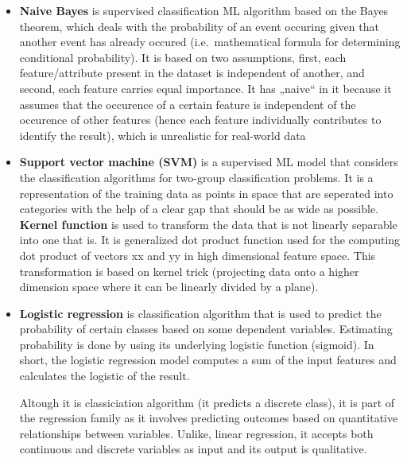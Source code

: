 \documentclass[
  letterpaper,
]{book}
\begin{document}
\begin{itemize}
  \begin{itemize}
  \item
    \textbf{Naive Bayes} is supervised classification ML algorithm based
    on the Bayes theorem, which deals with the probability of an event
    occuring given that another event has already occured
    (i.e.~mathematical formula for determining conditional probability).
    It is based on two assumptions, first, each feature/attribute
    present in the dataset is independent of another, and second, each
    feature carries equal importance. It has „naive`` in it because it
    assumes that the occurence of a certain feature is independent of
    the occurence of other features (hence each feature individually
    contributes to identify the result), which is unrealistic for
    real-world data
  \item
    \textbf{Support vector machine (SVM)} is a supervised ML model that
    considers the classification algorithms for two-group classification
    problems. It is a representation of the training data as points in
    space that are seperated into categories with the help of a clear
    gap that should be as wide as possible. \textbf{Kernel function} is
    used to transform the data that is not linearly separable into one
    that is. It is generalized dot product function used for the
    computing dot product of vectors xx and yy in high dimensional
    feature space. This transformation is based on kernel trick
    (projecting data onto a higher dimension space where it can be
    linearly divided by a plane).
  \item
    \textbf{Logistic regression} is classification algorithm that is
    used to predict the probability of certain classes based on some
    dependent variables. Estimating probability is done by using its
    underlying logistic function (sigmoid). In short, the logistic
    regression model computes a sum of the input features and calculates
    the logistic of the result.

    Altough it is classiciation algorithm (it predicts a discrete
    class), it is part of the regression family as it involves
    predicting outcomes based on quantitative relationships between
    variables. Unlike, linear regression, it accepts both continuous and
    discrete variables as input and its output is qualitative.


\end{itemize}
\end{itemize}
\end{document}
